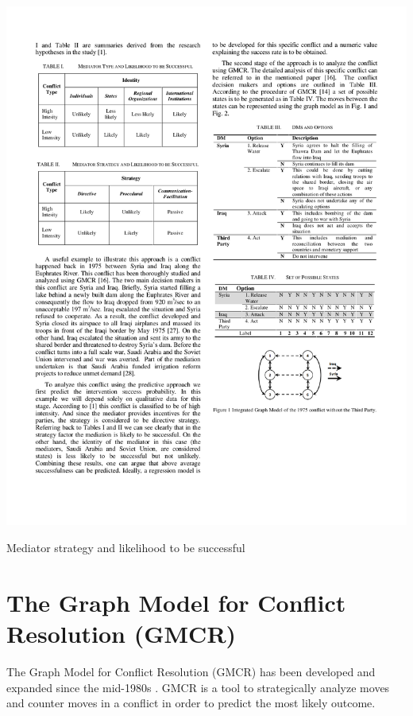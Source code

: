 \documentclass[letterpaper,12pt,titlepage,oneside,final]{book}
\begin{document}
\begin{center}

\begin{table}[H]
\centering
\includegraphics[scale=1]{PDF-IMG/MEDIATOR_STR.pdf}

\caption{Mediator strategy and likelihood to be successful}

\label{tbl:MEDIATOR_STR}
\end{table}
\end{center}


\section{The Graph Model for Conflict Resolution (GMCR)}
The Graph Model for Conflict Resolution (GMCR) has been developed and expanded since the mid-1980s \citep{kilgour2005}. GMCR is a tool to strategically analyze moves and counter moves in a conflict in order to predict the most likely outcome. 
\end{document}
